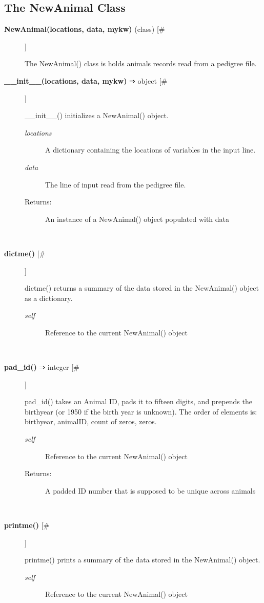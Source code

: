 \documentclass{article}
\begin{document}
\subsection*{The NewAnimal Class}
\begin{description}
\item[\textbf{NewAnimal(locations, data, mykw)} (class) [\#]
]
\par The NewAnimal() class is holds animals records read from a pedigree file.

\item[\textbf{\_\_init\_\_(locations, data, mykw)} ⇒ object [\#]
]
\par \_\_init\_\_() initializes a NewAnimal() object.
\begin{description}
\item[\textit{locations}
]
A dictionary containing the locations of variables in the input line.
\item[\textit{data}
]
The line of input read from the pedigree file.
\item[Returns:
]
An instance of a NewAnimal() object populated with data
\end{description}\\

\item[\textbf{dictme()} [\#]
]
\par dictme() returns a summary of the data stored in the NewAnimal() object
as a dictionary.
\begin{description}
\item[\textit{self}
]
Reference to the current NewAnimal() object
\end{description}\\

\item[\textbf{pad\_id()} ⇒ integer [\#]
]
\par pad\_id() takes an Animal ID, pads it to fifteen digits, and prepends the birthyear
(or 1950 if the birth year is unknown).  The order of elements is: birthyear, animalID,
count of zeros, zeros.
\begin{description}
\item[\textit{self}
]
Reference to the current NewAnimal() object
\item[Returns:
]
A padded ID number that is supposed to be unique across animals
\end{description}\\

\item[\textbf{printme()} [\#]
]
\par printme() prints a summary of the data stored in the NewAnimal() object.
\begin{description}
\item[\textit{self}
]
Reference to the current NewAnimal() object
\end{description}\\


\end{description}
\end{document}

